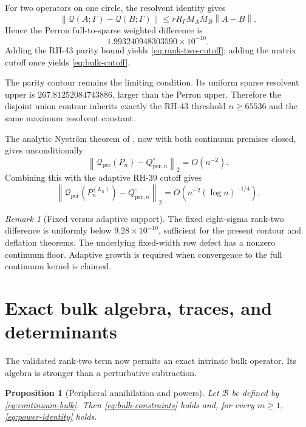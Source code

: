 \documentclass[11pt]{article}
\newtheorem{proposition}[theorem]{Proposition}
\theoremstyle{definition}
\theoremstyle{remark}
\newtheorem{remark}[theorem]{Remark}
\newcommand{\cB}{\mathcal B}
\newcommand{\cQ}{\mathcal Q}
\newcommand{\norm}[1]{\left\lVert #1\right\rVert}
\begin{document}
For two operators on one circle, the resolvent identity gives
\begin{equation}
 \norm{\cQ(A;\Gamma)-\cQ(B;\Gamma)}
 \le rR_\Gamma M_AM_B\norm{A-B}.
 \label{eq:weighted-lipschitz}
\end{equation}
Hence the Perron full-to-sparse weighted difference is
\begin{equation}
 1.993240948303590\times10^{-10}.
 \label{eq:perron-cutoff}
\end{equation}
Adding the RH-43 parity bound yields \eqref{eq:rank-two-cutoff}; adding the
matrix cutoff once yields \eqref{eq:bulk-cutoff}.

The parity contour remains the limiting condition.  Its uniform sparse
resolvent upper is $267.81252084743886$, larger than the Perron upper.
Therefore the disjoint union contour inherits exactly the RH-43 threshold
$n\ge65536$ and the same maximum resolvent constant.

The analytic Nystr\"om theorem of \citet{WangRiesz2026}, now with both
continuum premises closed, gives unconditionally
\begin{equation}
 \norm{\cQ_{\mathrm{per}}(P_n)-Q_{\mathrm{per},n}^\circ}_2
 =O(n^{-2}).
 \label{eq:rank-two-full-rate}
\end{equation}
Combining this with the adaptive RH-39 cutoff gives
\begin{equation}
 \norm{\cQ_{\mathrm{per}}(P_n^{(L_n)})
       -Q_{\mathrm{per},n}^\circ}_2
 =O\!\left(n^{-2}(\log n)^{-1/4}\right).
 \label{eq:rank-two-adaptive-rate}
\end{equation}

\begin{remark}[Fixed versus adaptive support]
The fixed eight-sigma rank-two difference is uniformly below
$9.28\times10^{-10}$, sufficient for the present contour and deflation
theorems.  The underlying fixed-width row defect has a nonzero continuum
floor.  Adaptive growth is required when convergence to the full continuum
kernel is claimed.
\end{remark}

\section{Exact bulk algebra, traces, and determinants}
\label{sec:bulk}

The validated rank-two term now permits an exact intrinsic bulk operator.
Its algebra is stronger than a perturbative subtraction.

\begin{proposition}[Peripheral annihilation and powers]
\label{prop:bulk-powers}
Let $\cB$ be defined by \eqref{eq:continuum-bulk}.  Then
\eqref{eq:bulk-constraints} holds and, for every $m\ge1$,
\eqref{eq:power-identity} holds.
\end{proposition}
\end{document}
